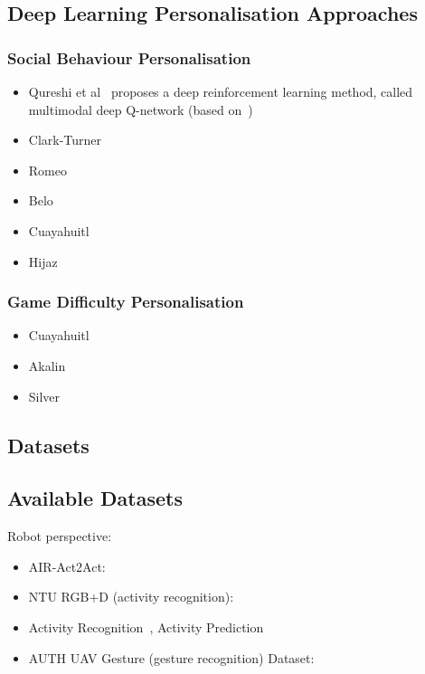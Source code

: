 \documentclass[thesis]{mas_proposal}
\begin{document}
\subsection{Deep Learning Personalisation Approaches}

\subsubsection{Social Behaviour Personalisation}
\begin{itemize}
	\item Qureshi et al~\cite{Qureshi2016} proposes a deep reinforcement learning method, called multimodal deep Q-network (based on~\cite{mnih2015human}) \cite{Qureshi2017} \cite{Qureshi2018}
	\item Clark-Turner~\cite{ClarkTurner2017,Turner2018}
	\item Romeo~\cite{Romeo2018,Romeo2019,romeo2021human}
	\item Belo~\cite{Belo2021,Belo2022}
	\item Cuayahuitl~\cite{Cuayahuitl2017}
	\item Hijaz~\cite{Hijaz2021}
\end{itemize}

\subsubsection{Game Difficulty Personalisation}

\begin{itemize}
	\item Cuayahuitl~\cite{Cuayahuitl2020}
	\item Akalin~\cite{Akalin2018}
	\item Silver~\cite{Silver2016}
\end{itemize}

\subsection{Datasets}
\subsection{Available Datasets}

Robot perspective:
\begin{itemize}
	\item AIR-Act2Act: \cite{Ko2021}
	\item NTU RGB+D (activity recognition): \cite{Liu2020,Shahroudy_2016_CVPR}
	\item Activity Recognition~\cite{ryoo2013firstperson}, Activity Prediction~\cite{ryoo2015robot}
	\item AUTH UAV Gesture (gesture recognition) Dataset:~\cite{patrona2021overview,Liu2020,Perera_2018_ECCV_Workshops}
\end{itemize}
\end{document}
